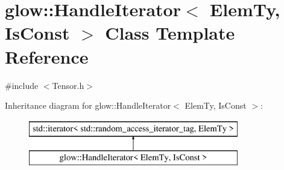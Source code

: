 \hypertarget{classglow_1_1_handle_iterator}{}\section{glow\+:\+:Handle\+Iterator$<$ Elem\+Ty, Is\+Const $>$ Class Template Reference}
\label{classglow_1_1_handle_iterator}


{\ttfamily \#include $<$Tensor.\+h$>$}

Inheritance diagram for glow\+:\+:Handle\+Iterator$<$ Elem\+Ty, Is\+Const $>$\+:\begin{figure}[H]
\begin{center}
\leavevmode
\includegraphics[height=2.000000cm]{classglow_1_1_handle_iterator}
\end{center}
\end{figure}
